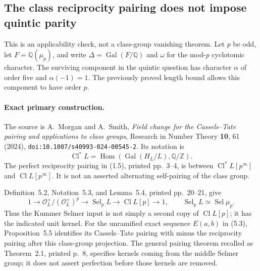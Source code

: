 \subsection{The class reciprocity pairing does not impose quintic parity}
\label{KT-QUINTIC-CLASS-PAIRING-SCOPE}

This is an applicability check, not a class-group vanishing theorem.
Let $p$ be odd, let $F=\mathbb Q(\mu_p)$, and write
$\Delta=\operatorname{Gal}(F/\mathbb Q)$ and $\omega$ for the mod-$p$
cyclotomic character.  The surviving component in the quintic question has
character $\alpha$ of order five and $\alpha(-1)=1$.  The previously proved
length bound allows this component to have order $p$.

\paragraph{Exact primary construction.}
The source is A.~Morgan and A.~Smith, \emph{Field change for the
Cassels--Tate pairing and applications to class groups}, Research in
Number Theory \textbf{10}, 61 (2024),
\texttt{doi:10.1007/s40993-024-00545-2}.
Its notation is
\[
 \operatorname{Cl}^{*}L=
 \operatorname{Hom}(\operatorname{Gal}(H_L/L),\mathbb Q/\mathbb Z).
\]
The perfect reciprocity pairing in (1.5), printed pp.~3--4, is between
$\operatorname{Cl}^{*}L[p^\infty]$ and
$\operatorname{Cl}L[p^\infty]$.  It is not an asserted alternating
self-pairing of the class group.

Definition~5.2, Notation~5.3, and Lemma~5.4, printed pp.~20--21, give
\[
 1\longrightarrow\mathcal O_L^\times/(\mathcal O_L^\times)^p
 \longrightarrow\operatorname{Sel}_pL
 \longrightarrow\operatorname{Cl}L[p]\longrightarrow1,
 \qquad
 \operatorname{Sel}_pL\simeq\operatorname{Sel}\mu_p.
 \tag{CP.1}
\]
Thus the Kummer Selmer input is not simply a second copy of
$\operatorname{Cl}L[p]$; it has the indicated unit kernel.
For the unramified exact sequence $E(a,b)$ in (5.3), Proposition~5.5
identifies its Cassels--Tate pairing with minus the reciprocity pairing
after this class-group projection.  The general pairing theorem recalled
as Theorem~2.1, printed p.~8, specifies kernels coming from the middle
Selmer group; it does not assert perfection before those kernels are
removed.

